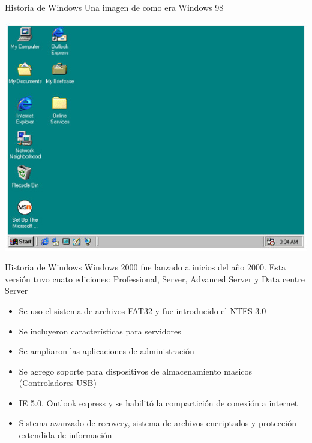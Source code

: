\documentclass[11pt]{beamer}
\begin{document}
		\begin{frame}{Historia de Windows}
			Una imagen de como era Windows 98
			
			\includegraphics[scale=0.6]{w98.jpg}
		\end{frame}
		\begin{frame}{Historia de Windows}
			Windows 2000 fue lanzado a inicios del año 2000. Esta versión tuvo cuato ediciones: Professional, Server, Advanced Server y Data centre Server
			\begin{itemize}
				\item Se uso el sistema de archivos FAT32 y fue introducido el NTFS 3.0
				\item Se incluyeron características para servidores
				\item Se ampliaron las aplicaciones de administración
				\item Se agrego soporte para dispositivos de almacenamiento masicos (Controladores USB)
				\item IE 5.0, Outlook express y se habilitó la compartición de conexión a internet 
				\item Sistema avanzado de recovery, sistema de archivos encriptados y protección extendida de información
			\end{itemize}
		\end{frame}
\end{document}
